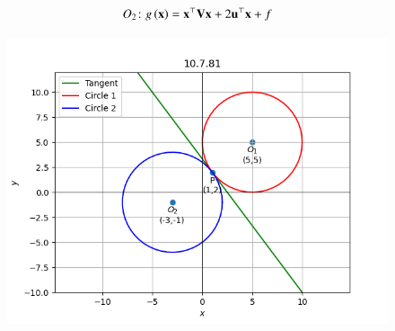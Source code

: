 \documentclass[journal]{IEEEtran}
\numberwithin{equation}{enumi}
\numberwithin{figure}{enumi}
\begin{document}
\begin{table}[H]
    \centering
    
    \caption*{}
    \label{tab:placeholder}
\end{table}

\begin{align}
    O_2 \colon g\left(\mathbf{x}\right) = \mathbf{x}^{\top}\mathbf{V}\mathbf{x} + 2\mathbf{u}^{\top}\mathbf{x} + f 
\end{align}

\begin{table}[H]
    \centering
    
    \caption*{}
    \label{tab:placeholder}
\end{table}

\begin{figure}[H]
    \centering
    \includegraphics[width=1\columnwidth]{figs/graph2.png}
    \caption*{}
    \label{fig:placeholder}
\end{figure}
\end{document}
